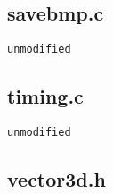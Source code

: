 \documentclass[]{article}
\begin{document}
\subsection{savebmp.c}
\begin{Verbatim}[fontsize= \footnotesize, tabsize=4]
unmodified
\end{Verbatim}

\subsection{timing.c}
\begin{Verbatim}[fontsize= \footnotesize, tabsize=4]
unmodified
\end{Verbatim}

\subsection{vector3d.h} 
\end{document}
